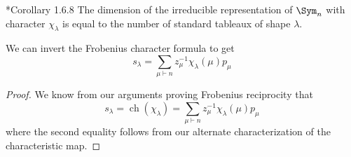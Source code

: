 \documentclass[11pt,leqno,oneside]{amsart}
\numberwithin{thm}{section}
\newcommand{\partitionof}{\vdash}
\newcommand{\ch}{\operatorname{ch}}
\begin{document}
\begin{cor}
  \cite{manivel}*{Corollary 1.6.8} The dimension of the irreducible representation of \(\Sym_n\) with
  character \(\chi_\lambda\) is equal to the number of standard
  tableaux of shape \(\lambda\).
\end{cor}
\begin{cor}
  We can invert the Frobenius character formula to get \[
    s_\lambda = \sum_{\mu \partitionof n} z_\mu^{-1} \chi_\lambda(\mu) p_\mu
  \]
\end{cor}
\begin{proof}
  We know from our arguments proving Frobenius reciprocity that \[
    s_\lambda = \ch(\chi_\lambda) = \sum_{\mu \partitionof n}
    z_\mu^{-1} \chi_\lambda(\mu) p_\mu
  \]
  where the second equality follows from our alternate
  characterization of the characteristic map.
\end{proof}
\end{document}
